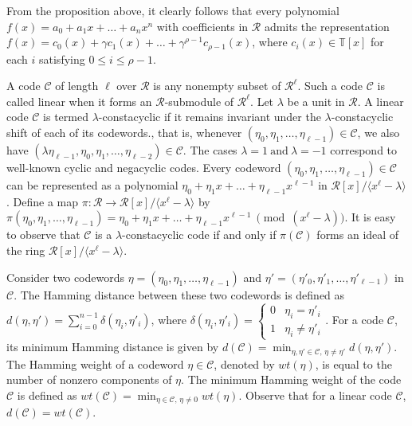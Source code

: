 \documentclass[12pt,a4paper]{article}
\begin{document}
From the proposition above, it clearly follows that every polynomial $f(x)=a_0+a_1x+\dots+a_nx^n$ with coefficients in $\mathcal{R}$ admits the representation $f(x)=c_0(x)+\gamma c_1(x)+\dots+\gamma^{\rho-1}c_{\rho-1}(x)$, where $c_i(x) \in \mathbb{T}[x]$ for each $i$ satisfying $0 \le i \le \rho-1$.

A code $\mathcal{C}$ of length $\ell$ over $\mathcal{R}$ is any nonempty subset of $\mathcal{R}^{\ell}$. Such a code $\mathcal{C}$ is called linear when it forms an $\mathcal{R}$-submodule of $\mathcal{R}^{\ell}$. Let $\lambda$ be a unit in $\mathcal{R}$. A linear code $\mathcal{C}$ is termed
$\lambda$-constacyclic if it remains invariant under the
$\lambda$-constacyclic shift of each of its codewords., that is, whenever $(\eta_0, \eta_1, \dots, \eta_{\ell-1}) \in \mathcal{C}$, we also have $(\lambda \eta_{\ell-1}, \eta_0, \eta_1, \dots, \eta_{\ell-2}) \in \mathcal{C}$. The cases $\lambda=1~\text{and}~\lambda=-1$ correspond to well-known cyclic and negacyclic codes. Every codeword $(\eta_0, \eta_1, \dots, \eta_{\ell-1}) \in \mathcal{C}$ can be represented as a polynomial $\eta_0+\eta_1x+\dots+\eta_{\ell-1}x^{\ell-1}$ in $\mathcal{R}[x]/\langle x^{\ell} - \lambda \rangle$. Define a map $\pi:\mathcal{R} \to \mathcal{R}[x]/\langle x^{\ell} - \lambda \rangle$ by $\pi(\eta_0, \eta_1, \dots, \eta_{\ell-1})=\eta_0+\eta_1x+\dots+\eta_{\ell-1}x^{\ell-1}~\pmod{(x^{\ell}-\lambda)}$. It is easy to observe that $\mathcal{C}$ is a $\lambda$-constacyclic code if and only if $\pi(\mathcal{C})$ forms an ideal of the ring $\mathcal{R}[x]/\langle x^{\ell} - \lambda \rangle$.


Consider two codewords $\eta = (\eta_0, \eta_1, \dots, \eta_{\ell-1})$ and $\eta' = (\eta'_0, \eta'_1, \dots, \eta'_{\ell-1})$ in $\mathcal{C}$. The Hamming distance between these two codewords is defined as $d(\eta,\eta') = \sum_{i=0}^{n-1} \delta(\eta_i,\eta'_i)$, where $\delta(\eta_i,\eta'_i)=\begin{cases} 0 & \eta_i = \eta'_i\\ 1 & \eta_i \ne \eta'_i \end{cases}$. For a code $\mathcal{C}$, its minimum Hamming distance is given by $d(\mathcal{C})=\min_{{\eta,\eta'} \in \mathcal{C},\, \eta \ne {\eta'}} d({\eta,\eta'})$. The Hamming weight of a codeword $\eta \in \mathcal{C}$, denoted by $wt(\eta)$, is equal to the number of nonzero components of $\eta$. The minimum Hamming weight of the code $\mathcal{C}$ is defined as $wt(\mathcal{C}) = \min_{\eta \in \mathcal{C},\, \eta \ne 0} wt(\eta)$. Observe that for a linear code $\mathcal{C}$, $d(\mathcal{C}) = wt(\mathcal{C})$.
\end{document}
